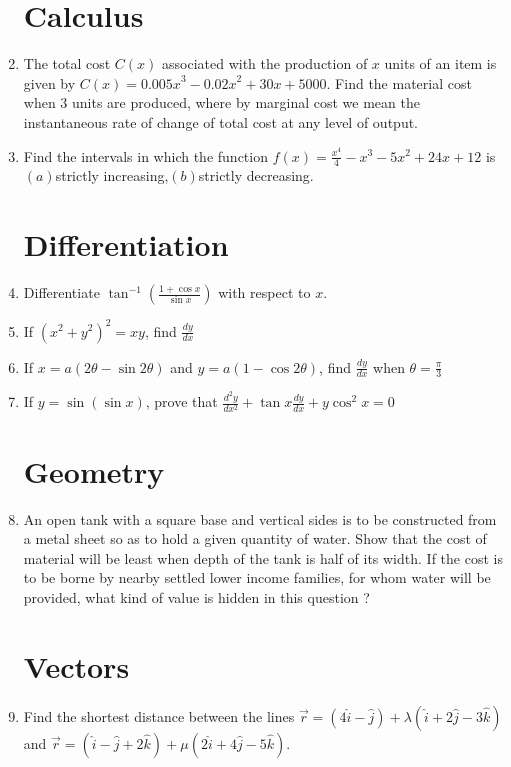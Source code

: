 \documentclass[10pt,-letter paper]{article}
\providecommand{\brak}[1]{\ensuremath{\left(#1\right)}}
\begin{document}
\begin{enumerate}
\section{Calculus}
\item The total cost $C\brak{x}$ associated with the production of $x$ units of an item is given by $C\brak{x} = {0.005x}^3-{0.02x}^2+30x+5000$. Find the material cost when $3$ units are produced, where by marginal cost we mean the instantaneous rate of change of total cost at any level of output.
\item Find the intervals in which the function $f\brak{x}=\frac{x^4}{4}-x^{3}-5x^{2}+24x+12 $ is $(a)$strictly increasing,$(b)$strictly decreasing.



\section{Differentiation}
\item Differentiate  $\tan^{-1}\brak{\frac{1+\cos x}{\sin x}}$ with respect to $x$.
\item If ${\brak{x^{2}+y^{2}}}^{2}=xy$, find $\frac{dy}{dx}$
\item If $x=a\brak{2\theta-\sin 2\theta}$ and $y=a\brak{1-\cos 2\theta}$, find $\frac{dy}{dx}$ when $\theta=\frac{\pi}{3}$
\item If $y=\sin\brak{\sin x}$, prove that $\frac{d^{2}y}{dx^{2}}+\tan x \frac{dy}{dx}+y\cos^{2}x=0$
	




\section{Geometry}
\item An open tank with a square base and vertical sides is to be constructed from a metal sheet so as to hold a given quantity of water. Show that the cost of material will be least when depth of the tank is half of its width. If the cost is to be borne by nearby settled lower income families, for whom water will be provided, what kind of value is hidden in this question ?


\section{Vectors}
\item Find the shortest distance between the lines $\overrightarrow{r}=\brak{4\hat{i}-\hat{j}}+\lambda\brak{\hat{i}+2\hat{j}-3\hat{k}}$ and $\overrightarrow{r}=\brak{\hat{i}-\hat{j}+2\hat{k}}+\mu\brak{2\hat{i}+4\hat{j}-5\hat{k}}$.


\end{enumerate}
\end{document}
